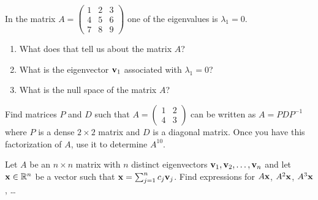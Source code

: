 \begin{problem}
    In the matrix $A = \begin{pmatrix} 1 & 2 & 3 \\ 4 & 5 & 6 \\ 7 & 8 & 9 \end{pmatrix}$
    one of the eigenvalues is $\lambda_1 = 0$.
    \begin{enumerate}
        \item What does that tell us about the matrix $A$?
        \item What is the eigenvector ${\bf v}_1$ associated with $\lambda_1 = 0$?  
        \item What is the null space of the matrix $A$?
    \end{enumerate}
\end{problem}

\begin{problem}
    Find matrices $P$ and $D$ such that $A = \begin{pmatrix} 1 & 2 \\ 4 & 3 \end{pmatrix}$
        can be written as $A = PDP^{-1}$ where $P$ is a dense $2 \times 2$ matrix and $D$
        is a diagonal matrix.  Once you have this factorization of $A$, use it to
        determine $A^{10}$.
\end{problem}

\begin{problem}
    Let $A$ be an $n \times n$ matrix with $n$ distinct eigenvectors ${\bf v}_1, {\bf v}_2, \dots,
    {\bf v}_n$ and let ${\bf x} \in \mathbb{R}^n$ be a vector such that ${\bf x} = \sum_{j=1}^n c_j
    {\bf v}_j$. Find expressions for $A{\bf x}$, $A^2 {\bf x}$, $A^3{\bf x}$, \dots
\end{problem}

